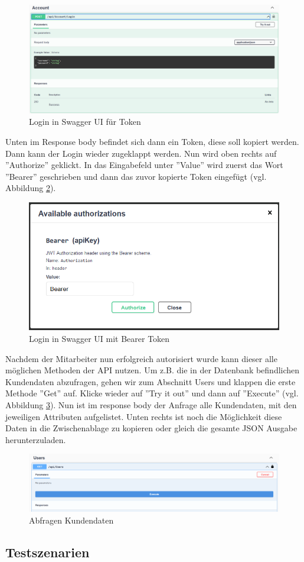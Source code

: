 \begin{figure}[h]
	\centering
	\includegraphics[width=0.9\linewidth]{Images/Projekt_Messe_Swagger1}
	\caption{Login in Swagger UI für Token}
	\label{fig:projektmesseswagger1}
\end{figure}

Unten im Response body befindet sich dann ein Token, diese soll kopiert werden. Dann kann der Login wieder zugeklappt werden. Nun wird oben rechts auf ''Authorize'' geklickt. In das Eingabefeld unter ''Value'' wird zuerst das Wort ''Bearer'' geschrieben und dann das zuvor kopierte Token eingefügt (vgl. Abbildung \ref{fig:projektmesseswagger2}).

\begin{figure}[h]
	\centering
	\includegraphics[width=0.7\linewidth]{Images/Projekt_Messe_Swagger2}
	\caption{Login in Swagger UI mit Bearer Token}
	\label{fig:projektmesseswagger2}
\end{figure}

Nachdem der Mitarbeiter nun erfolgreich autorisiert wurde kann dieser alle möglichen Methoden der API nutzen. Um z.B. die in der Datenbank befindlichen Kundendaten abzufragen, gehen wir zum Abschnitt Users und klappen die erste Methode ''Get'' auf. Klicke wieder auf ''Try it out'' und dann auf ''Execute'' (vgl. Abbildung \ref{fig:projektmesseswagger3}). Nun ist im response body der Anfrage alle Kundendaten, mit den jeweiligen Attributen aufgelistet. Unten rechts ist noch die Möglichkeit diese Daten in die Zwischenablage zu kopieren oder gleich die gesamte JSON Ausgabe herunterzuladen.

\begin{figure}[h]
	\centering
	\includegraphics[width=0.9\linewidth]{Images/Projekt_Messe_Swagger3}
	\caption{Abfragen Kundendaten}
	\label{fig:projektmesseswagger3}
\end{figure}


\subsection{Testszenarien}


